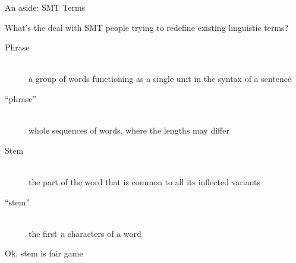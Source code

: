\documentclass{beamer}
\begin{document}
\begin{frame}{An aside: SMT Terms}

What's the deal with SMT people trying to redefine existing linguistic terms?

\begin{description}
  \item[Phrase] \hfill \\
  a group of words functioning as a single unit in the syntax of a sentence
  \item[``phrase''] \hfill \\
  whole sequences of words, where the lengths may differ
  \item[Stem] \hfill \\
  the part of the word that is common to all its inflected variants
  \item[``stem''] \hfill \\
  the first {\em n} characters of a word
\end{description}

\footnotesize{Ok, stem is fair game}

\end{frame}
\end{document}
